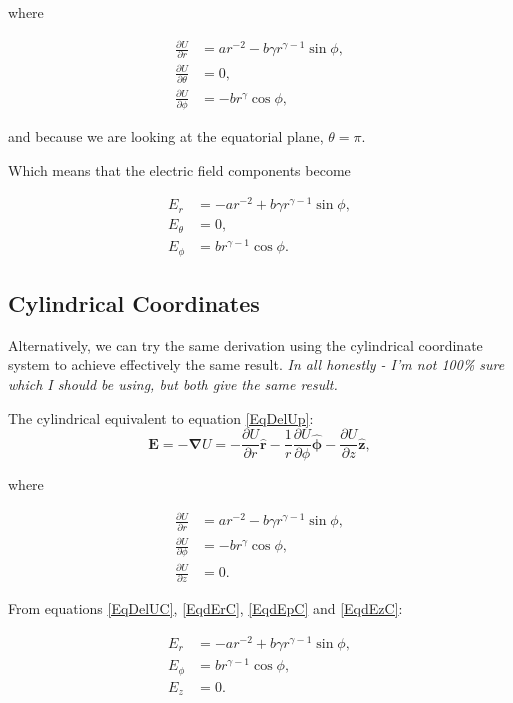 \documentclass[]{article}
\begin{document}
	where 
	
	\begin{align}
		\frac{\partial U}{\partial r} &= a r^{-2} - b \gamma r^{\gamma -1} \sin{\phi}, \\
		\frac{\partial U}{\partial \theta} &= 0, \\
		\frac{\partial U}{\partial \phi} & = -b r^{\gamma} \cos{\phi},
	\end{align}
	
	and because we are looking at the equatorial plane, $\theta = \pi$.
	
	Which means that the electric field components become
	
	\begin{align}
		E_r &= -a r^{-2} + b \gamma r^{\gamma-1} \sin{\phi}, \\
		E_\theta &= 0, \\
		E_\phi &= b r^{\gamma-1}\cos{\phi}.
	\end{align}
	
\subsection{Cylindrical Coordinates}
	\label{SectCyl}	
	Alternatively, we can try the same derivation using the cylindrical coordinate system to achieve effectively the same result. \textit{In all honestly - I'm not 100\% sure which I should be using, but both give the same result.}
	
	The cylindrical equivalent to equation \ref{EqDelUp}:
	\begin{equation}
		\mathbf{E} =  - \mathbf{\nabla} U = -\frac{\partial U}{\partial r} \mathbf{\hat{r}} - \frac{1}{r} \frac{\partial U}{\partial \phi} \mathbf{\hat{\phi}} - \frac{\partial U}{\partial z}\mathbf{\hat{z}}, \label{EqDelUC}
	\end{equation}
		
	where 
	
	\begin{align}
		\frac{\partial U}{\partial r} &= a r^{-2} - b \gamma r^{\gamma -1} \sin{\phi}, \label{EqdErC} \\
		\frac{\partial U}{\partial \phi} & = -b r^{\gamma} \cos{\phi}, \label{EqdEpC} \\
		\frac{\partial U}{\partial z} &= 0.  \label{EqdEzC}
	\end{align}
		
	From equations \ref{EqDelUC}, \ref{EqdErC}, \ref{EqdEpC} and \ref{EqdEzC}:
	
	
	\begin{align}
		E_r &= -a r^{-2} + b \gamma r^{\gamma-1} \sin{\phi}, \\
		E_\phi &= b r^{\gamma-1}\cos{\phi}, \\
		E_z &= 0.
	\end{align}
\end{document}
